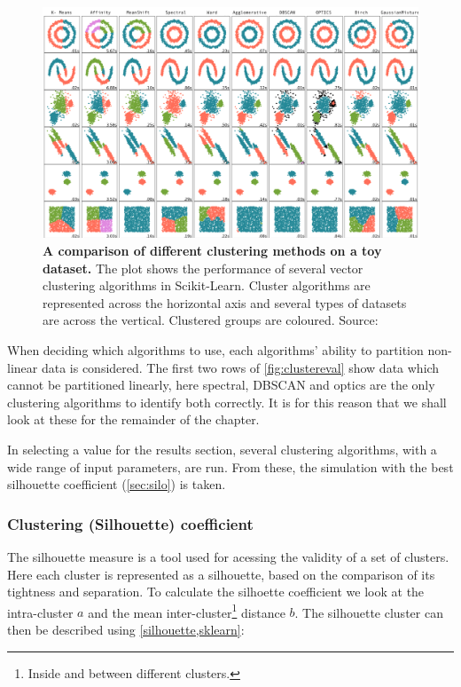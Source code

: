 \begin{figure}[H]
     \centering

         \includegraphics[width=\textwidth]{4fig/clustereval.png}

        \caption{\textbf{A comparison of different clustering methods on a toy dataset.} The plot shows the performance of several vector clustering algorithms in Scikit-Learn. Cluster algorithms are represented across the horizontal axis and several types of datasets are across the vertical. Clustered groups are coloured. Source: \cite{clustereval}}
        \label{fig:clustereval}
\end{figure}


When deciding which algorithms to use, each algorithms' ability to partition non-linear data is considered. 
The first two rows of \autoref{fig:clustereval} show data which cannot be partitioned linearly, here spectral, DBSCAN and optics are the only clustering algorithms to identify both correctly. It is for this reason that we shall look at these for the remainder of the chapter. 

In selecting a value for the results section, several clustering algorithms, with a wide range of input parameters, are run. From these, the simulation with the best silhouette coefficient (\autoref{sec:silo}) is taken. 




\subsubsection{Clustering (Silhouette) coefficient}\label{sec:silo}
The silhouette measure is a tool used for acessing the validity of a set of clusters. Here each cluster is represented as a silhouette, based on the comparison of its tightness and separation. To calculate the silhoette coefficient we look at the intra-cluster $a$ and the mean inter-cluster\footnote{Inside and between different clusters.} distance $b$. The silhouette cluster can then be described using \ref{silhouette,sklearn}:

